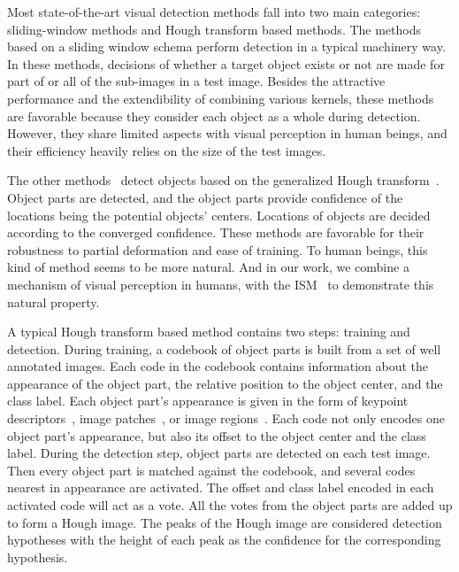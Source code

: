 Most state-of-the-art visual
 detection methods fall into two main categories: sliding-window methods and Hough transform based methods. The methods~\citep{ac4,ac1} based on a sliding window schema perform detection in a typical machinery way. In these methods, decisions of whether a target object exists or not are made for part of or all of the sub-images in a test image. Besides the attractive performance and the extendibility of combining various kernels, these methods are favorable because they consider each object as a whole during detection. However, they share limited aspects with visual perception in human beings, and their efficiency heavily relies on the size of the test images.




The other methods~\citep{lb1,ac2,ac3,ac18} detect objects based on the generalized Hough transform~\citep{ac17}. Object parts are detected, and the object parts provide confidence of the locations being the potential objects' centers. Locations of objects are decided according to the converged confidence. These methods are favorable for their robustness to partial deformation and ease of training. To human beings, this kind of method seems to be more natural. And in our work, we combine a mechanism of visual perception in humans, with the ISM~\citep{lb1} to demonstrate this natural property.

A typical Hough transform based method contains two steps: training and detection. During training, a codebook of object parts is built from a set of well annotated images. Each code in the codebook contains information about the appearance of the object part, the relative position to the object center, and the class label. Each object part's appearance is given in the form of keypoint descriptors~\citep{lb1}, image patches~\citep{ac6,ac7}, or image regions~\citep{ac8}. Each code not only encodes one object part's appearance, but also its offset to the object center and the class label. During the detection step, object parts are detected on each test image. Then every object part is matched against the codebook, and  several codes nearest in appearance are activated. The offset and class label encoded in each activated code will act as a vote. All the votes from the object parts are added up to form a Hough image. The peaks of the Hough image are considered  detection hypotheses with the height of each peak as the confidence for the corresponding hypothesis.

